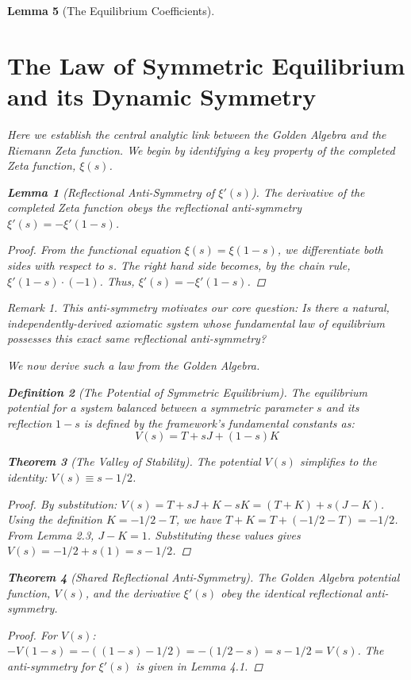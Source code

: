 \documentclass{article}
\theoremstyle{plain}
\newtheorem{theorem}{Theorem}[section]
\newtheorem{lemma}[theorem]{Lemma}
\theoremstyle{definition}
\newtheorem{definition}[theorem]{Definition}
\theoremstyle{remark}
\newtheorem*{remark}{Remark}
\begin{document}
\begin{lemma}[The Equilibrium Coefficients]
\section{The Law of Symmetric Equilibrium and its Dynamic Symmetry}
Here we establish the central analytic link between the Golden Algebra and the Riemann Zeta function. We begin by identifying a key property of the completed Zeta function, $\xi(s)$.

\begin{lemma}[Reflectional Anti-Symmetry of $\xi'(s)$]
The derivative of the completed Zeta function obeys the reflectional anti-symmetry $\xi'(s) = -\xi'(1-s)$.
\end{lemma}
\begin{proof}
From the functional equation $\xi(s) = \xi(1-s)$, we differentiate both sides with respect to $s$. The right hand side becomes, by the chain rule, $\xi'(1-s) \cdot (-1)$. Thus, $\xi'(s) = -\xi'(1-s)$.
\end{proof}

\begin{remark}
This anti-symmetry motivates our core question: Is there a natural, independently-derived axiomatic system whose fundamental law of equilibrium possesses this exact same reflectional anti-symmetry?
\end{remark}

We now derive such a law from the Golden Algebra.

\begin{definition}[The Potential of Symmetric Equilibrium]
The equilibrium potential for a system balanced between a symmetric parameter $s$ and its reflection $1-s$ is defined by the framework's fundamental constants as:
$$V(s) = T + sJ + (1-s)K$$
\end{definition}

\begin{theorem}[The Valley of Stability]
The potential $V(s)$ simplifies to the identity: $V(s) \equiv s - 1/2$.
\end{theorem}
\begin{proof}
By substitution: $V(s) = T + sJ + K - sK = (T+K) + s(J-K)$. Using the definition $K=-1/2-T$, we have $T+K = T+(-1/2-T) = -1/2$. From Lemma 2.3, $J-K=1$. Substituting these values gives $V(s) = -1/2 + s(1) = s - 1/2$.
\end{proof}

\begin{theorem}[Shared Reflectional Anti-Symmetry]
The Golden Algebra potential function, $V(s)$, and the derivative $\xi'(s)$ obey the identical reflectional anti-symmetry.
\end{theorem}
\begin{proof}
For $V(s)$: $-V(1-s) = -((1-s) - 1/2) = -(1/2 - s) = s - 1/2 = V(s)$. The anti-symmetry for $\xi'(s)$ is given in Lemma 4.1.
\end{proof}


\end{lemma}
\end{document}
